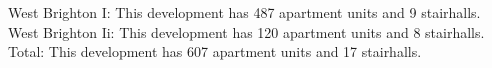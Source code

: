 {West Brighton I}: This development has 487 apartment units and 9 stairhalls.\\{West Brighton Ii}: This development has 120 apartment units and 8 stairhalls.\\{Total}: This development has 607 apartment units and 17 stairhalls.\\